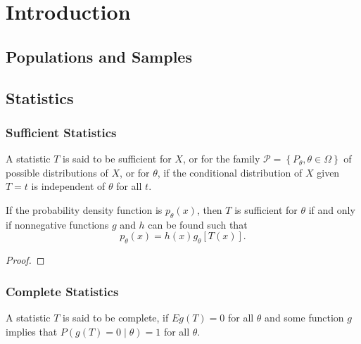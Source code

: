 \chapter{Introduction}

\section{Populations and Samples}

\section{Statistics}

\subsection{Sufficient Statistics}

\begin{definition}
    A statistic $T$ is said to be sufficient for $X$, or for the family $\mathcal{P}=\left\{P_{\theta}, \theta \in \Omega\right\}$ of possible distributions of $X$, or for $\theta$, if the conditional distribution of $X$ given $T=t$ is independent of $\theta$ for all $t$.
\end{definition}

\begin{theorem}
    If the probability density function is $p_{\theta}(x)$, then $T$ is sufficient for $\theta$ if and only if nonnegative functions $g$ and $h$ can be found such that
    \begin{equation*}
        p_{\theta}(x)=h(x)g_{\theta}[T(x)].
    \end{equation*}
\end{theorem}

\begin{proof}

\end{proof}

\subsection{Complete Statistics}

\begin{definition}
    A statistic $T$ is said to be complete, if $Eg(T)=0$ for all $\theta$ and some function $g$ implies that $P(g(T)=0\mid\theta)=1$ for all $\theta$.
\end{definition}

